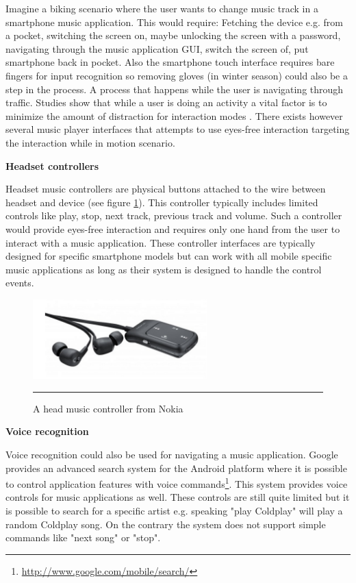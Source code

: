 Imagine a biking scenario where the user wants to change music track in a smartphone music application. This would require: Fetching the device e.g. from a pocket, switching the screen on, maybe unlocking the screen with a password, navigating through the music application GUI, switch the screen of, put smartphone back in pocket. Also the smartphone touch interface requires bare fingers for input recognition so removing gloves (in winter season) could also be a step in the process. A process that happens while the user is navigating through traffic. Studies show that while a user is doing an activity a vital factor is to minimize the amount of distraction for interaction modes \cite{pascoe_using_2000}. There exists however several music player interfaces that attempts to use eyes-free interaction targeting the interaction while in motion scenario.

\textbf{Headset controllers}

Headset music controllers are physical buttons attached to the wire between headset and device (see figure \ref{fig:nokia}). This controller typically includes limited controls like play, stop, next track, previous track and volume. Such a controller would provide eyes-free interaction and requires only one hand from the user to interact with a music application. These controller interfaces are typically designed for specific smartphone models but can work with all mobile specific music applications as long as their system is designed to handle the control events.

\begin{figure}[t]
	\centering
		\includegraphics[width=0.6\textwidth,height=\textheight,keepaspectratio]{./Figures/nokia-headset.png}
		\rule{35em}{0.5pt}
	\caption[Nokia music headset]{A head music controller from Nokia \cite{nokia_launch:_2011}}
	\label{fig:nokia}
\end{figure}

\textbf{Voice recognition}

Voice recognition could also be used for navigating a music application. Google provides an advanced search system for the Android platform where it is possible to control application features with voice commands\footnote{\url{http://www.google.com/mobile/search/}}. This system provides voice controls for music applications as well. These controls are still quite limited but it is possible to search for a specific artist e.g. speaking "play Coldplay" will play a random Coldplay song. On the contrary the system does not support simple commands like "next song" or "stop".

